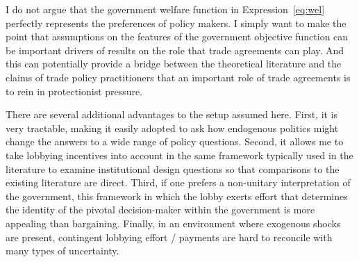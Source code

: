 \documentclass[12pt,titlepage]{article}
\newcommand{\ga}{\gamma}
\begin{document}
I do not argue that the government welfare function in Expression~\ref{eq:wel} perfectly represents the preferences of policy makers. I simply want to make the point that assumptions on the features of the government objective function can be important drivers of results on the role that trade agreements can play. And this can potentially provide a bridge between the theoretical literature and the claims of trade policy practitioners that an important role of trade agreements is to rein in protectionist pressure.

There are several additional advantages to the setup assumed here. First, it is very tractable, making it easily adopted to ask how endogenous politics might change the answers to a wide range of policy questions. Second, it allows me to take lobbying incentives into account in the same framework typically used in the literature to examine institutional design questions so that comparisons to the existing literature are direct. Third, if one prefers a non-unitary interpretation of the government, this framework in which the lobby exerts effort that determines the identity of the pivotal decision-maker within the government is more appealing than bargaining. Finally, in an environment where exogenous shocks are present, contingent lobbying effort / payments are hard to reconcile with many types of uncertainty. 

\end{document}
